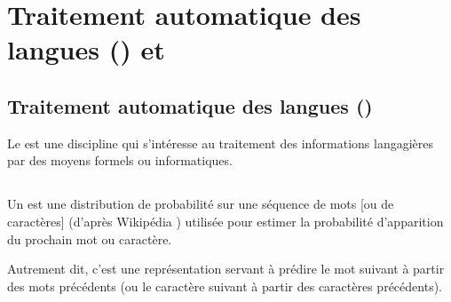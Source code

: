 

\section{Traitement automatique des langues () et }
\subsection{Traitement automatique des langues ()}
\label{subsec:nlp} \label{def:nlp}
Le  est une discipline qui s'intéresse au traitement des informations langagières par des moyens formels ou informatiques.

\subsection{} \label{def:lm}
Un  est une \og distribution de probabilité sur une séquence de mots [ou de caractères]\fg{} (d'après Wikipédia \autocite{wiki_lm})
utilisée pour estimer la probabilité d'apparition du prochain mot ou caractère.

Autrement dit, c'est une représentation servant à prédire le mot suivant à partir des mots précédents (ou le caractère suivant à partir des caractères précédents).

\pagebreak

